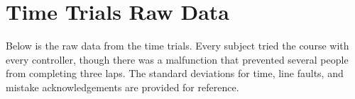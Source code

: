 \documentclass[12pt, letterpaper]{report}
\begin{document}
\section*{Time Trials Raw Data}
Below is the raw data from the time trials. Every subject tried the course with every controller, though there was a malfunction that prevented several people from completing three laps. The standard deviations for time, line faults, and mistake acknowledgements are provided for reference.\\

\end{document}
